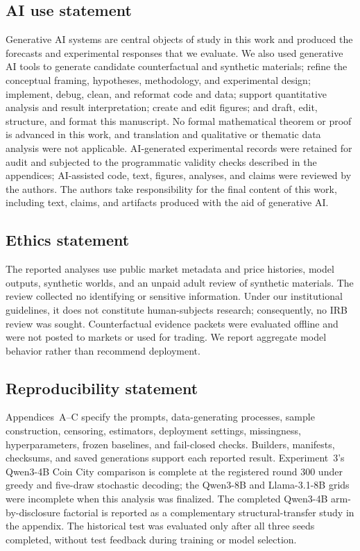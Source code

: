 \subsection*{AI use statement}

Generative AI systems are central objects of study in this work and produced the
forecasts and experimental responses that we evaluate. We also used generative AI
tools to generate candidate counterfactual and synthetic materials; refine the
conceptual framing, hypotheses, methodology, and experimental design; implement,
debug, clean, and reformat code and data; support quantitative analysis and result
interpretation; create and edit figures; and draft, edit, structure, and format this
manuscript. No formal mathematical theorem or proof is advanced in this work, and
translation and qualitative or thematic data analysis were not applicable.
AI-generated experimental records were retained for audit and subjected to the
programmatic validity checks described in the appendices; AI-assisted code, text,
figures, analyses, and claims were reviewed by the authors. The authors take
responsibility for the final content of this work, including text, claims, and
artifacts produced with the aid of generative AI.

\subsection*{Ethics statement}

The reported analyses use public market metadata and price histories, model
outputs, synthetic worlds, and an unpaid adult review of synthetic materials. The
review collected no identifying or sensitive information. Under our institutional
guidelines, it does not constitute human-subjects research; consequently, no IRB
review was sought. Counterfactual evidence packets were evaluated offline and were
not posted to markets or used for trading. We report aggregate model behavior
rather than recommend deployment.

\subsection*{Reproducibility statement}

Appendices~A--C specify the prompts, data-generating processes, sample construction,
censoring, estimators, deployment settings, missingness, hyperparameters, frozen
baselines, and fail-closed checks. Builders, manifests, checksums, and saved
generations support each reported result. Experiment~3's Qwen3-4B Coin City
comparison is complete at the registered round 300 under greedy and five-draw
stochastic decoding; the Qwen3-8B and Llama-3.1-8B grids were incomplete when this
analysis was finalized. The completed Qwen3-4B arm-by-disclosure factorial is reported
as a complementary structural-transfer study in the appendix.
The historical test was evaluated only after all three seeds completed, without
test feedback during training or model selection.
